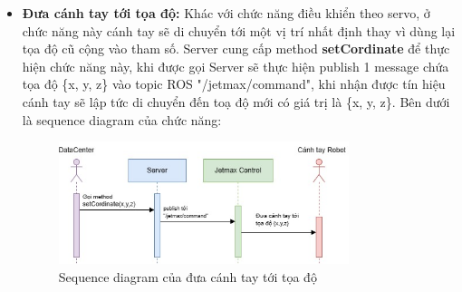 \begin{itemize}
    \item \textbf{Đưa cánh tay tới tọa độ:} Khác với chức năng điều khiển theo servo, ở chức năng này cánh tay sẽ di chuyển tới một vị trí nhất định thay vì dùng lại tọa độ cũ cộng vào tham số. Server cung cấp method \textbf{setCordinate} để thực hiện chức năng này, khi được gọi Server sẽ thực hiện publish 1 message chứa tọa độ \{x, y, z\} vào topic ROS "/jetmax/command", khi nhận được tín hiệu cánh tay sẽ lập tức di chuyển đến toạ độ mới có giá trị là \{x, y, z\}. Bên dưới là sequence diagram của chức năng:
    \begin{figure}[!h]
        \centering
        \includegraphics[width=0.8\textwidth]{Images/Implementation/Control/setCordinate.jpg}
        \caption{Sequence diagram của đưa cánh tay tới tọa độ}
    \end{figure}
    

\end{itemize}
